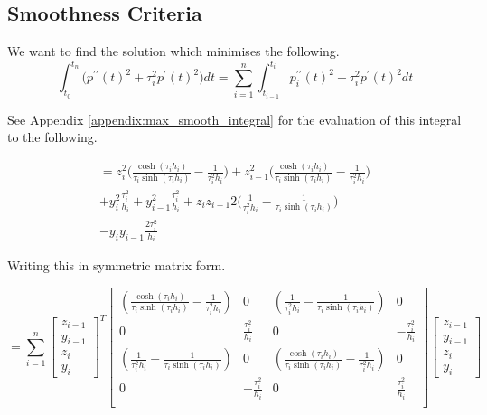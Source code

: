 \documentclass{article}
\begin{document}
\subsection{Smoothness Criteria}
We want to find the solution which minimises the following.
\begin{equation}
    \int_{t_0}^{t_n} \bigl( p^{\prime\prime}(t)^2 + \tau_i^2 p^{\prime}(t)^2 \bigr) dt = 
    \sum_{i=1}^{n}\int_{t_{i - 1}}^{t_i}p^{\prime\prime}_i(t)^2 + \tau_i^2 p^{\prime}(t)^2 dt
\end{equation}

See Appendix \ref{appendix:max_smooth_integral} for the evaluation of this integral to the
following.

\begin{multline}
    = z_i^2 \biggl( \frac{\cosh(\tau_i h_i)}{\tau_i \sinh(\tau_i h_i)} -
    \frac{1}{\tau_i^2 h_i} \biggr) 
    + z_{i-1}^2 \biggl( \frac{\cosh(\tau_i h_i)}{\tau_i \sinh(\tau_i h_i)} -
    \frac{1}{\tau_i^2 h_i} \biggr) \\
    + y_i^2 \frac{\tau_i^2}{h_i} + y_{i-1}^2 \frac{\tau_i^2}{h_i} 
    + z_i z_{i-1} 2 \biggl( \frac{1}{\tau_i^2 h_i} - \frac{1}{\tau_i \sinh(\tau_i h_i)} \biggr) \\
    - y_i y_{i-1} \frac{2 \tau_i^2}{h_i}
\end{multline}

Writing this in symmetric matrix form.

\begin{equation}
    = \sum_{i=1}^{n} \begin{bmatrix}
        z_{i-1} \\ y_{i-1} \\ z_i \\ y_i
    \end{bmatrix}^T
    \begin{bmatrix}
        \left(\frac{\cosh(\tau_i h_i)}{\tau_i \sinh(\tau_i h_i)} - \frac{1}{\tau_i^2 h_i} \right) & 0 & \left( \frac{1}{\tau_i^2 h_i} - \frac{1}{\tau_i \sinh(\tau_i h_i)} \right) & 0 \\
        0 & \frac{\tau_i^2}{h_i} & 0 & -\frac{\tau_i^2}{h_i} \\
        \left(\frac{1}{\tau_i^2 h_i} - \frac{1}{\tau_i \sinh(\tau_i h_i)}\right) & 0 & \left(\frac{\cosh(\tau_i h_i)}{\tau_i \sinh(\tau_i h_i)} - \frac{1}{\tau_i^2 h_i} \right) & 0 \\
        0 & -\frac{\tau_i^2}{h_i} & 0 & \frac{\tau_i^2}{h_i} \\
    \end{bmatrix}
    \begin{bmatrix}
        z_{i-1} \\ y_{i-1} \\ z_i \\ y_i
    \end{bmatrix}
\end{equation}
\end{document}
